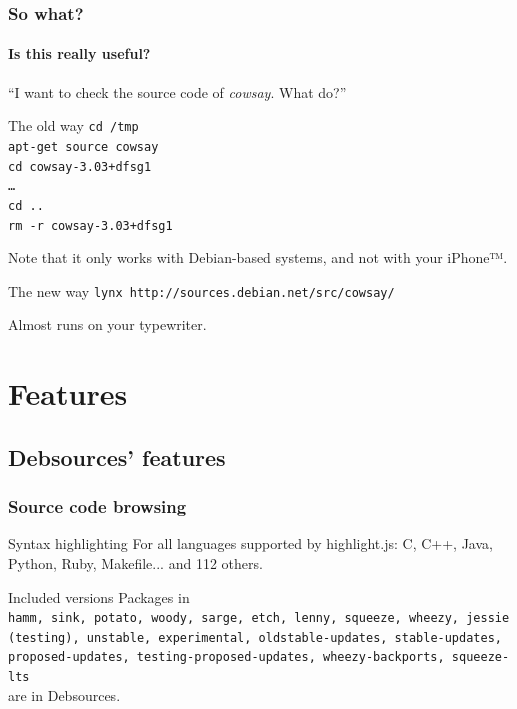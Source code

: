 \documentclass{beamer}
\begin{document}
\begin{frame}
  \frametitle{So what?}
  \framesubtitle{Is this really useful?}
  ``I want to check the source code of \textit{cowsay}. What do?''
  \begin{block}{The old way}
    \texttt{cd /tmp\\
      apt-get source cowsay\\
      cd cowsay-3.03+dfsg1\\
      \ldots\\
      cd ..\\
      rm -r cowsay-3.03+dfsg1
    }
  \end{block}
  \small{Note that it only works with Debian-based systems, and not
    with your iPhone™.}
  \pause
  \begin{block}{The new way}
    \texttt{lynx http://sources.debian.net/src/cowsay/}
  \end{block}
  \small{Almost runs on your typewriter.}
\end{frame}

\section{Features}

\subsection{Debsources' features}

\begin{frame}
  \frametitle{Source code browsing}
  \begin{block}{Syntax highlighting}
    For all languages supported by \alert{highlight.js}: C, C++,
    Java, Python, Ruby, Makefile... and 112 others.
  \end{block}
  \pause
  \begin{block}{Included versions}
    Packages in\\

    \texttt{hamm, sink, potato, woody, sarge, etch, lenny, squeeze,
      \alert{wheezy}, \alert{jessie (testing)}, \alert{unstable},
      experimental, oldstable-updates, stable-updates,
      proposed-updates, testing-proposed-updates, wheezy-backports,
      squeeze-lts}\\

    are in Debsources.
  \end{block}
    
\end{frame}
\end{document}
